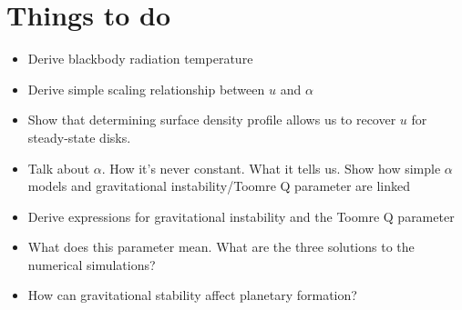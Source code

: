\documentclass[aps,pra,twocolumn]{revtex4-1}
\begin{document}
\section{Things to do}

\begin{itemize}
  \item Derive blackbody radiation temperature
  \item Derive simple scaling relationship between $u$ and $\alpha$
  \item Show that determining surface density profile allows us to recover $u$ for steady-state disks.
  \item Talk about $\alpha$.  How it's never constant.  What it tells us.  Show how simple $\alpha$ models and gravitational instability/Toomre Q parameter are linked
  \item Derive expressions for gravitational instability and the Toomre Q parameter
  \item What does this parameter mean.  What are the three solutions to the numerical simulations?
  \item How can gravitational stability affect planetary formation?
\end{itemize}




\end{document}
